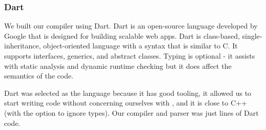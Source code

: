 
\subsubsection{Dart}
We built our compiler using Dart\cite{dartlang}.
Dart is an open-source language developed by Google that is
designed for building scalable web apps. Dart is class-based,
single-inheritance,
object-oriented language with a syntax that is similar to C. It supports
interfaces, generics, and abstract classes. Typing is optional - it assists
with static analysis and dynamic runtime checking but it does affect the
semantics of the code.

Dart was selected as the language because it has good tooling, it allowed
	us to start writing code without concerning ourselves with ,
	and it is close to C++ (with the option to ignore types).
Our compiler and parser was just  lines of Dart code.
